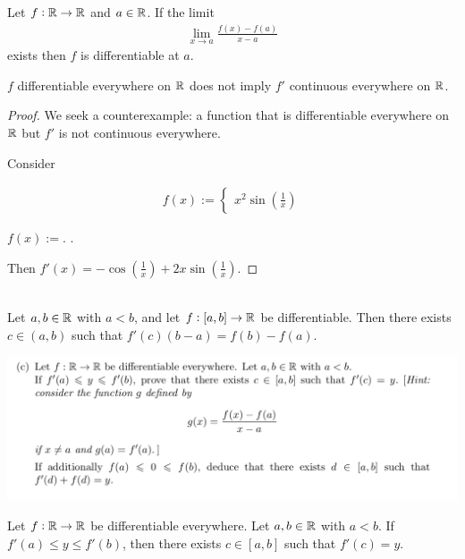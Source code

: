 \documentclass[12pt]{article}
\begin{document}
\begin{definition*}
  Let $f: \mathbb{R} \to \mathbb{R}$ and $a \in \mathbb{R}$. If the limit
  \begin{align*}
    \lim_{x \to a} \frac{f(x) - f(a)}{x - a}
  \end{align*}
  exists then $f$ is differentiable at $a$.
\end{definition*}




\begin{theorem*}
  $f$ differentiable everywhere on $\mathbb{R}$ does not imply $f'$ continuous everywhere on $\mathbb{R}$.
\end{theorem*}

\begin{proof}
We seek a counterexample: a function that is differentiable everywhere on $\mathbb{R}$ but $f'$ is not
continuous everywhere.

Consider

\begin{align*}
  f(x) :=
  \begin{cases}
    x^2\sin(\frac{1}{x})
  \end{cases}

\end{align*}

 $f(x) := $. .

Then $f'(x) = -\cos(\frac{1}{x}) + 2x\sin(\frac{1}{x})$.
\end{proof}


\begin{theorem*}~\\
  Let $a, b \in \mathbb{R}$ with $a < b$, and let $f:[a, b] \to \mathbb{R}$ be differentiable. Then there exists
  $c \in (a, b)$ such that $f'(c)(b - a) = f(b) - f(a)$.
\end{theorem*}


\begin{mdframed}
\includegraphics[width=400pt]{img/misc--cambridge-1a-2017-1-9D-3.png}
\end{mdframed}


\begin{theorem*}
  Let $f: \mathbb{R} \to \mathbb{R}$ be differentiable everywhere. Let $a, b \in \mathbb{R}$ with $a < b$. If
  $f'(a) \leq y \leq f'(b)$, then there exists $c \in [a, b]$ such that $f'(c) = y$.
\end{theorem*}
\end{document}
